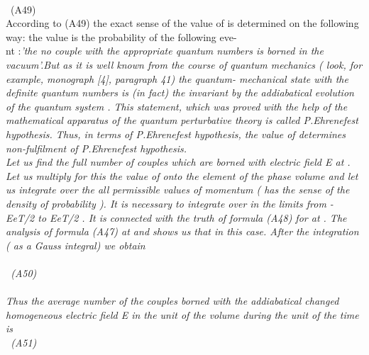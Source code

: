 \documentclass[a4paper,12pt] {article}
\begin{document}
 \\ \coordHE{} \ (A49)\\ According to (A49) the exact sense of the value of \myHighlight{$ \rho$}\coordHE{} is
determined on the following way: the value \coordHE{} is the probability of the following eve-\\nt
 :\it 'the no couple with the appropriate quantum numbers is borned in the vacuum'.\rm  But as it is well
 known from the course of quantum mechanics ( look, for example,
monograph [4], paragraph 41) \it the  quantum- mechanical state with the definite quantum numbers is
(in fact) the invariant by the addiabatical evolution of the quantum system . \rm This statement, which
was proved with the help
of the mathematical apparatus of the { \it quantum perturbative theory} is called{ \it   P.Ehrenefest
hypothesis}.  Thus, in   terms of  P.Ehrenefest hypothesis, the value of \myHighlight{$ \rho$}\coordHE{}  determines
\it non-fulfilment of  P.Ehrenefest hypothesis.
\\ \rm  Let us find { \it the full  number of  couples which are  borned with electric field }E \it at  \rm
 \coordHE{}. Let us multiply for this the value of \myHighlight{$ \rho$}\coordHE{}  onto the element of the phase volume
 \coordHE{} and let us
integrate over the all permissible values of momentum (\myHighlight{$ \rho$}\coordHE{}  has the sense \it of the density of
probability \rm ).
It is necessary to integrate over \coordHE{}in the limits from - EeT/2 to EeT/2 . It is connected with the truth
of  formula  (A48)   for  \myHighlight{$\rho $}\coordHE{}  at  \coordHE{}
. The analysis of formula (A47) at \coordHE{}and \coordHE{} shows us that
\coordHE{} in this case. After the integration ( as a Gauss integral)  we obtain
\\ \coordHE{} \\ \coordHE{} \ (A50)
\\\\ Thus \it the average number of the couples
borned with the addiabatical changed homogeneous electric field \rm E  \it in the unit of the volume
during
the  unit of  the time \rm is \\ \coordHE{} \ (A51)
\end{document}
